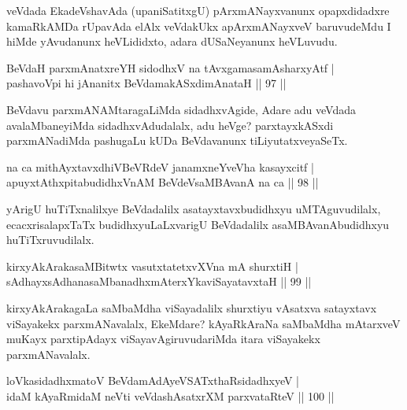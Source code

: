\begin{artha}
veVdada EkadeVshavAda (upaniSatitxgU) pArxmANayxvanunx opapxdidadxre kamaRkAMDa rUpavAda elAlx veVdakUkx apArxmANayxveV baruvudeMdu I hiMde yAvudanunx heVLididxto, adara dUSaNeyanunx heVLuvudu. 
\end{artha}


\begin{shl}
BeVdaH parxmAnatxreYH sidodhxV na tAvxgamasamAsharxyAtf  | \\
pashavoV\s pi hi jAnanitx BeVdamakASxdimAnataH \hfill||  97 || 
\end{shl}

\begin{artha}
BeVdavu parxmANAMtaragaLiMda sidadhxvAgide, Adare adu veVdada avalaMbaneyiMda sidadhxvAdudalalx, adu heVge? parxtayxkASxdi parxmANadiMda pashugaLu kUDa BeVdavanunx tiLiyutatxveyaSeTx.
\end{artha}


\begin{shl}
na ca mithAyxtavxdhiVBeVRdeV janamxneYveVha kasayxcitf  | \\
apuyxtAthxpitabudidhxVnAM BeVdeV\s saMBAvanA na ca \hfill||  98 ||  
\end{shl}

\begin{artha}
yArigU huTiTxnalilxye BeVdadalilx asatayxtavxbudidhxyu uMTAguvudilalx, ecacxrisalapxTaTx budidhxyuLaLxvarigU BeVdadalilx asaMBAvanAbudidhxyu huTiTxruvudilalx.
\end{artha}

\begin{shl}
kirxyAkArakasaMBitwtx vasutxtatetxvXVna mA shurxtiH  | \\
sAdhayxsAdhanasaMbanadhxmAterxYkaviSayatavxtaH \hfill||  99 ||  
\end{shl}

\begin{artha}
kirxyAkArakagaLa saMbaMdha viSayadalilx shurxtiyu vAsatxva satayxtavx viSayakekx parxmANavalalx, EkeMdare? kAyaRkAraNa saMbaMdha mAtarxveV muKayx parxtipAdayx viSayavAgiruvudariMda itara viSayakekx parxmANavalalx.
\end{artha}

\begin{shl}
loVkasidadhxmatoV BeVdamAdAyeVSATxthaRsidadhxyeV  | \\
idaM kAyaRmidaM neVti veVdashAsatxrXM parxvataRteV \hfill||  100 ||  
\end{shl}

